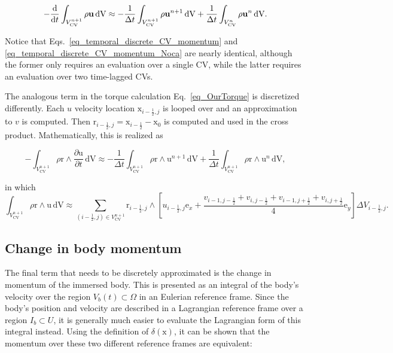 \documentclass[review]{elsarticle}
\renewcommand \d [2]{\frac{{\rm d} #1}{{\rm d} #2}}
\newcommand \D [2]{\frac{\partial #1}{\partial #2}}
\renewcommand{\vec}[1]{\bm{\mathrm{#1}}}
\def \x{\vec{x}}
\def \r{\vec{r}}
\def \u{\vec{u}}
\def \e{\vec{e}}
\def \Vbt{V_b(t)}
\def  \Vcv{V_\text{CV}}
\def \e{\vec{e}}
\def \half{\frac{1}{2}}
\def \u{\vec{u}}
\def \x{\vec{x}}
\def \dt{\Delta t}
\def \delV{\Delta V}
\def \dV{\,\mathrm{dV}}
\def \dt{\Delta t}
\begin{document}
\begin{equation}
\label{eq_temporal_discrete_CV_momentum_Noca}
-\d{}{t}\int_{\Vcv^{n+1}} \rho \u \dV  \approx 
 -\frac{1}{\dt}\int_{\Vcv^{n+1}} \rho \u^{n+1} \dV + \frac{1}{\dt}\int_{\Vcv^{n}} \rho \u^{n} \dV.
\end{equation}

\noindent Notice that Eqs.~\eqref{eq_temporal_discrete_CV_momentum} and
\eqref{eq_temporal_discrete_CV_momentum_Noca} are nearly identical, although
the former only requires an evaluation over a single CV, while the latter requires an
evaluation over two time-lagged CVs.

The analogous term in the torque calculation Eq.~\eqref{eq_OurTorque} is discretized
differently. Each $u$ velocity location $\x_{i-\half,j}$ is looped over and an
approximation to $v$ is computed. Then $\r_{i-\half,j} = \x_{i-\half} - \x_0$ is computed
and used in the cross product. Mathematically, this is realized as

\begin{equation}
\label{eq_temporal_discrete_CV_angular_momentum}
-\int_{\Vcv^{n+1}} \rho \r \wedge \D{\u}{t} \dV \approx
-\frac{1}{\dt}\int_{\Vcv^{n+1}} \rho \r \wedge \u^{n+1} \dV + \frac{1}{\dt}\int_{\Vcv^{n+1}} \rho \r \wedge \u^{n} \dV,
\end{equation}  

\noindent in which 
\begin{equation}
\label{eq_discrete_CV_angular_momentum}
\int_{\Vcv^{n+1}} \rho \r \wedge \u \dV \approx 
\sum_{(i-\half,j) \in \Vcv^{n+1}} \r_{i-\half,j} \wedge \left[u_{i-\half,j} \e_x 
+ \frac{v_{i-1,j-\half} + v_{i,j-\half} + v_{i-1,j+\half} + v_{i,j+\half}}{4}\e_y\right] \delV_{i-\half,j}.
\end{equation}

\subsection{Change in body momentum}
The final term that needs to be discretely approximated is the change in momentum
of the immersed body. This is presented as an integral of the body's velocity over the 
region $\Vbt \subset \Omega$ in an Eulerian reference frame. Since the body's position and velocity 
are described in a Lagrangian reference frame over a region $I_b \subset U$, it is generally much easier to evaluate
the Lagrangian form of this integral instead. Using the definition of $\delta(\x)$, it can be shown
that the momentum over these two different reference frames are equivalent:
\end{document}

